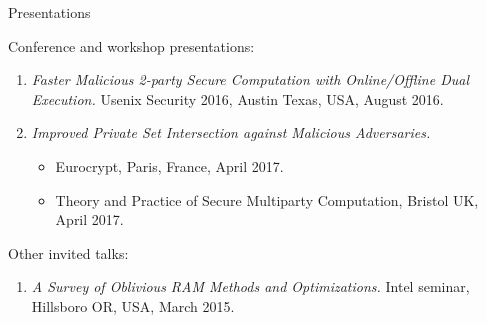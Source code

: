\documentclass{resume} %
\begin{document}

\begin{rSection}{Presentations}
	
	Conference and workshop presentations:
	\begin{enumerate}[label=P\arabic*]
		
		\item \emph{Faster Malicious 2-party Secure Computation with Online/Offline Dual Execution.} Usenix Security 2016, Austin Texas, USA, August 2016.
		
		\item \emph{Improved Private Set Intersection against Malicious Adversaries.} 
		\begin{itemize}
			\item Eurocrypt, Paris, France, April 2017.
			\item Theory and Practice of Secure Multiparty Computation, Bristol UK, April 2017.
		\end{itemize}
	\end{enumerate}
	
	\bigskip
	
	Other invited talks:	
	\begin{enumerate}[label=T\arabic*]
		
		\item \emph{A Survey of Oblivious RAM Methods and Optimizations.} Intel seminar, Hillsboro OR, USA, March 2015.
		
	\end{enumerate}
	
\end{rSection}


\end{document}
